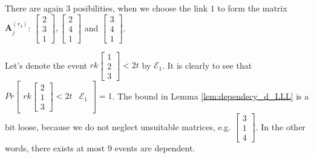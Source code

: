 There are again 3 posibilities, when we choose the link $1$ to form
the matrix $\boldsymbol{A}_{j}^{\left(r_{3}\right)}$: $\left[\begin{array}{c}
2\\
3\\
1
\end{array}\right],\left[\begin{array}{c}
2\\
4\\
1
\end{array}\right]$ and $\left[\begin{array}{c}
3\\
4\\
1
\end{array}\right]$.

Let's denote the event $rk\left[\begin{array}{c}
1\\
2\\
3
\end{array}\right]<2t$ by $\mathcal{E}_{1}$. It is clearly to see that $Pr\left[\begin{array}{c|c}
rk\left[\begin{array}{c}
2\\
1\\
3
\end{array}\right]<2t & \mathcal{E}_{1}\end{array}\right]=1$. The bound in Lemma \ref{lem:dependecy_d_LLL} is a bit loose, because
we do not neglect unsuitable matrices, e.g. $\left[\begin{array}{c}
3\\
1\\
4
\end{array}\right]$. In the other words, there exists at most 9 events are dependent. 

